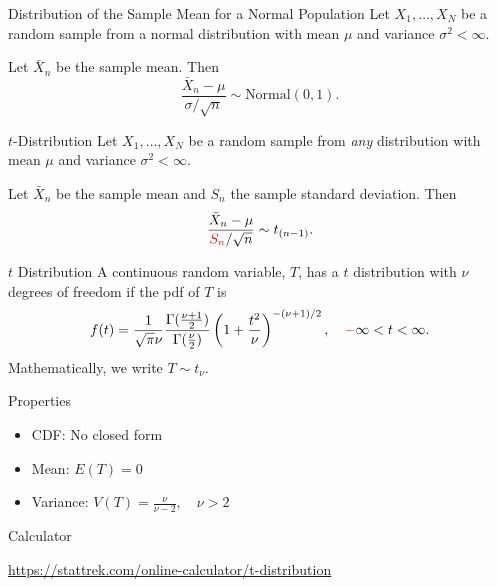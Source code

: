 \begin{frame}
  \begin{block}{Distribution of the Sample Mean for a Normal Population}
    Let $X_1,\ldots,X_N$ be a random sample from a normal distribution with mean $\mu$ and variance $\sigma^2 < \infty$. 
    
    \medskip
    
    Let $\bar X_n$ be the sample mean. Then
    $$
    \frac{\bar X_n-\mu}{\sigma/\sqrt{n}} \sim \mbox{Normal}(0,1).
    $$ 
  \end{block}
\end{frame}

\begin{frame}
  \begin{block}{$t$-Distribution}
    Let $X_1,\ldots,X_N$ be a random sample from \textit{any} distribution with mean $\mu$ and variance $\sigma^2 < \infty$. 
    
    \medskip
    
    Let $\bar X_n$ be the sample mean and $S_n$ the sample standard deviation. Then
    $$
    \frac{\bar X_n-\mu}{\textcolor{red}{S_n}/\sqrt{n}} \sim t_{(n-1)}.
    $$  
  \end{block}
\end{frame}

\begin{frame}
  \begin{block}{$t$ Distribution}
    A continuous random variable, $T$, has a $t$ distribution with $\nu$ degrees of freedom if the pdf of $T$ is
    \[
      f(t)=\frac{1}{\sqrt{\pi}\nu}
      \frac{\Gamma(\frac{\nu + 1}{2})}{\Gamma(\frac{\nu}{2})}
      \left(1 + \frac{t^2}{\nu}\right)^{-(\nu + 1)/2}, \quad \textcolor{red}{-}\infty < t <\infty.
    \]
    Mathematically, we write $T \sim t_{\nu}$.
  \end{block}
\end{frame}

\begin{frame}
 \begin{block}{Properties}
        \begin{itemize}
        \item CDF: No closed form
        \item Mean: $E(T)=0$
        \item Variance: $V(T)=\frac{\nu}{\nu-2}, \quad \nu > 2$
        \end{itemize}
  \end{block}
  
  \begin{block}{Calculator}
  \begin{center}
  \url{https://stattrek.com/online-calculator/t-distribution}
  \end{center}

  \end{block}  
\end{frame}



